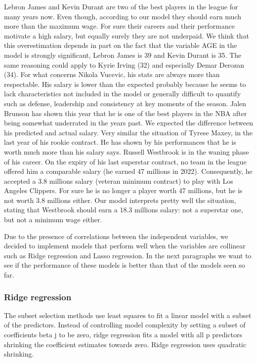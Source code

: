 \documentclass[
]{article}
\begin{document}
Lebron James and Kevin Durant are two of the best players in the league
for many years now. Even though, according to our model they should earn
much more than the maximum wage. For sure their careers and their
performance motivate a high salary, but equally surely they are not
underpaid. We think that this overestimation depends in part on the fact
that the variable AGE in the model is strongly significant, Lebron James
is 39 and Kevin Durant is 35. The same reasoning could apply to Kyrie
Irving (32) and especially Demar Derozan (34). For what concerns Nikola
Vucevic, his stats are always more than respectable. His salary is lower
than the expected probably because he seems to lack characteristics not
included in the model or generally difficult to quantify such as
defense, leadership and consistency at key moments of the season. Jalen
Brunson has shown this year that he is one of the best players in the
NBA after being somewhat underrated in the years past. We expected the
difference between his predicted and actual salary. Very similar the
situation of Tyrese Maxey, in the last year of his rookie contract. He
has shown by his performances that he is worth much more than his salary
says. Russell Westbrook is in the waning phase of his career. On the
expiry of his last superstar contract, no team in the league offered him
a comparable salary (he earned 47 millions in 2022). Consequently, he
accepted a 3.8 millions salary (veteran minimum contract) to play with
Los Angeles Clippers. For sure he is no longer a player worth 47
millions, but he is not worth 3.8 millions either. Our model interprets
pretty well the situation, stating that Westbrook should earn a 18.3
millions salary: not a superstar one, but not a minimum wage either.

Due to the presence of correlations between the independent variables,
we decided to implement models that perform well when the variables are
collinear such as Ridge regression and Lasso regression. In the next
paragraphs we want to see if the performance of these models is better
than that of the models seen so far.

\hypertarget{ridge-regression}{%
\subsubsection{Ridge regression}\label{ridge-regression}}

The subset selection methods use least squares to fit a linear model
with a subset of the predictors. Instead of controlling model complexity
by setting a subset of coefficients beta j to be zero, ridge regression
fits a model with all p predictors shrinking the coefficient estimates
towards zero. Ridge regression uses quadratic shrinking.
\end{document}
